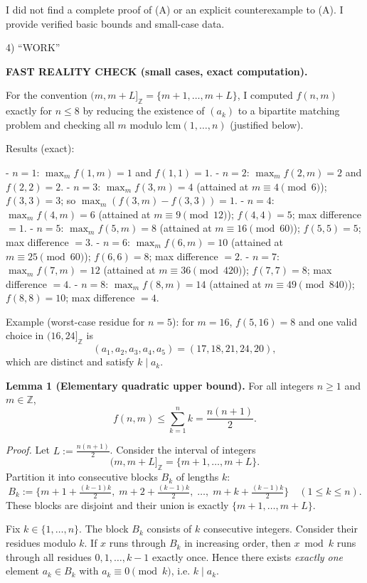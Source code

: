 I did not find a complete proof of (A) or an explicit counterexample to (A). I provide verified basic bounds and small-case data.

4) “WORK”

\textbf{FAST REALITY CHECK (small cases, exact computation).}

For the convention $(m,m+L]_{\mathbb Z}=\{m+1,\dots,m+L\}$, I computed $f(n,m)$ exactly for $n\le 8$ by reducing the existence of $(a_k)$ to a bipartite matching problem and checking all $m$ modulo $\mathrm{lcm}(1,\dots,n)$ (justified below).

Results (exact):

- $n=1$: $\max_m f(1,m)=1$ and $f(1,1)=1$.
- $n=2$: $\max_m f(2,m)=2$ and $f(2,2)=2$.
- $n=3$: $\max_m f(3,m)=4$ (attained at $m\equiv 4\pmod 6$); $f(3,3)=3$; so $\max_m(f(3,m)-f(3,3))=1$.
- $n=4$: $\max_m f(4,m)=6$ (attained at $m\equiv 9\pmod{12}$); $f(4,4)=5$; max difference $=1$.
- $n=5$: $\max_m f(5,m)=8$ (attained at $m\equiv 16\pmod{60}$); $f(5,5)=5$; max difference $=3$.
- $n=6$: $\max_m f(6,m)=10$ (attained at $m\equiv 25\pmod{60}$); $f(6,6)=8$; max difference $=2$.
- $n=7$: $\max_m f(7,m)=12$ (attained at $m\equiv 36\pmod{420}$); $f(7,7)=8$; max difference $=4$.
- $n=8$: $\max_m f(8,m)=14$ (attained at $m\equiv 49\pmod{840}$); $f(8,8)=10$; max difference $=4$.

Example (worst-case residue for $n=5$): for $m=16$, $f(5,16)=8$ and one valid choice in $(16,24]_{\mathbb Z}$ is
\[
(a_1,a_2,a_3,a_4,a_5)=(17,18,21,24,20),
\]
which are distinct and satisfy $k\mid a_k$.

\medskip
\textbf{Lemma 1 (Elementary quadratic upper bound).}
For all integers $n\ge 1$ and $m\in\mathbb Z$,
\[
 f(n,m)\le \sum_{k=1}^n k = \frac{n(n+1)}2.
\]

\emph{Proof.}
Let $L:=\frac{n(n+1)}2$. Consider the interval of integers
\[
(m,m+L]_{\mathbb Z} = \{m+1,\dots,m+L\}.
\]
Partition it into consecutive blocks $B_k$ of lengths $k$:
\[
B_k := \{ m+1+\tfrac{(k-1)k}{2},\; m+2+\tfrac{(k-1)k}{2},\;\dots,\; m+k+\tfrac{(k-1)k}{2}\}\quad (1\le k\le n).
\]
These blocks are disjoint and their union is exactly $\{m+1,\dots,m+L\}$.

Fix $k\in\{1,\dots,n\}$. The block $B_k$ consists of $k$ consecutive integers.
Consider their residues modulo $k$. If $x$ runs through $B_k$ in increasing order, then $x\bmod k$ runs through all residues $0,1,\dots,k-1$ exactly once. Hence there exists \emph{exactly one} element $a_k\in B_k$ with $a_k\equiv 0\pmod k$, i.e. $k\mid a_k$.

